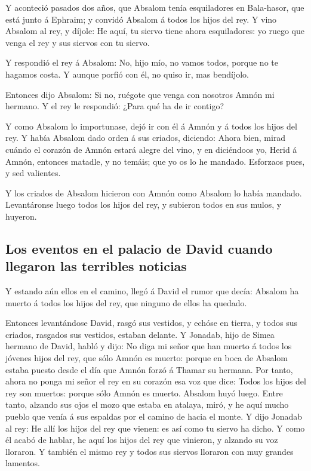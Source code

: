  Y aconteció pasados dos años, que Absalom tenía
esquiladores en Bala-hasor, que está junto á Ephraim; y convidó Absalom
á todos los hijos del rey.  Y vino Absalom al rey, y
díjole: He aquí, tu siervo tiene ahora esquiladores: yo ruego que venga
el rey y sus siervos con tu siervo.

 Y respondió el rey á Absalom: No, hijo mío, no vamos
todos, porque no te hagamos costa. Y aunque porfió con él, no quiso ir,
mas bendíjolo.

 Entonces dijo Absalom: Si no, ruégote que venga con
nosotros Amnón mi hermano. Y el rey le respondió: ¿Para qué ha de ir
contigo?

 Y como Absalom lo importunase, dejó ir con él á Amnón y á
todos los hijos del rey.  Y había Absalom dado orden á sus
criados, diciendo: Ahora bien, mirad cuándo el corazón de Amnón estará
alegre del vino, y en diciéndoos yo, Herid á Amnón, entonces matadle, y
no temáis; que yo os lo he mandado. Esforzaos pues, y sed valientes.

 Y los criados de Absalom hicieron con Amnón como Absalom
lo había mandado. Levantáronse luego todos los hijos del rey, y subieron
todos en sus mulos, y huyeron.

\hypertarget{los-eventos-en-el-palacio-de-david-cuando-llegaron-las-terribles-noticias}{%
\subsection{Los eventos en el palacio de David cuando llegaron las
terribles
noticias}\label{los-eventos-en-el-palacio-de-david-cuando-llegaron-las-terribles-noticias}}

 Y estando aún ellos en el camino, llegó á David el rumor
que decía: Absalom ha muerto á todos los hijos del rey, que ninguno de
ellos ha quedado.

 Entonces levantándose David, rasgó sus vestidos, y echóse
en tierra, y todos sus criados, rasgados sus vestidos, estaban delante.
 Y Jonadab, hijo de Simea hermano de David, habló y dijo:
No diga mi señor que han muerto á todos los jóvenes hijos del rey, que
sólo Amnón es muerto: porque en boca de Absalom estaba puesto desde el
día que Amnón forzó á Thamar su hermana.  Por tanto, ahora
no ponga mi señor el rey en su corazón esa voz que dice: Todos los hijos
del rey son muertos: porque sólo Amnón es muerto.  Absalom
huyó luego. Entre tanto, alzando sus ojos el mozo que estaba en atalaya,
miró, y he aquí mucho pueblo que venía á sus espaldas por el camino de
hacia el monte.  Y dijo Jonadab al rey: He allí los hijos
del rey que vienen: es así como tu siervo ha dicho.  Y como
él acabó de hablar, he aquí los hijos del rey que vinieron, y alzando su
voz lloraron. Y también el mismo rey y todos sus siervos lloraron con
muy grandes lamentos.

